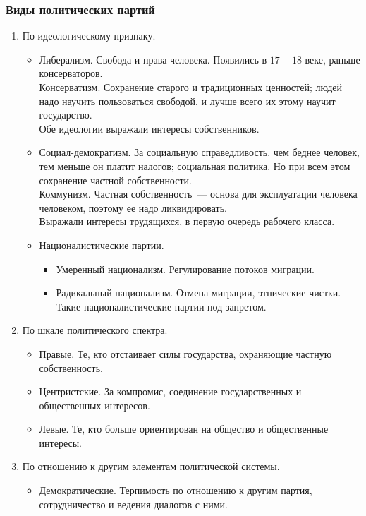 \documentclass[12pt]{article}
\begin{document}
	\subsubsection{Виды политических партий}
	\begin{enumerate}
		\item По идеологическому признаку.
		\begin{itemize}
			\item Либерализм. Свобода и права человека. Появились в $17 - 18$ веке, раньше консерваторов. \\
			Консерватизм. Сохранение старого и традиционных ценностей; людей надо научить пользоваться свободой, и лучше всего их этому научит государство. \\
			Обе идеологии выражали интересы собственников.
			\item Социал-демократизм. За социальную справедливость. чем беднее человек, тем меньше он платит налогов; социальная политика. Но при всем этом сохранение частной собственности. \\
			Коммунизм. Частная собственность~--- основа для эксплуатации человека человеком, поэтому ее надо ликвидировать. \\
			Выражали интересы трудящихся, в первую очередь рабочего класса.
			\item Националистические партии.
			\begin{itemize}
				\item Умеренный национализм. Регулирование потоков миграции.
				\item Радикальный национализм. Отмена миграции, этнические чистки. Такие националистические партии под запретом.
			\end{itemize}
		\end{itemize}
		\item По шкале политического спектра.
		\begin{itemize}
			\item Правые. Те, кто отстаивает силы государства, охраняющие частную собственность.
			\item Центристские. За компромис, соединение государственных и общественных интересов.
			\item Левые. Те, кто больше ориентирован на общество и общественные интересы.
		\end{itemize}
		\item По отношению к другим элементам политической системы.
		\begin{itemize}
			\item Демократические. Терпимость по отношению к другим партия, сотрудничество и ведения диалогов с ними.

\end{itemize}
\end{enumerate}
\end{document}

